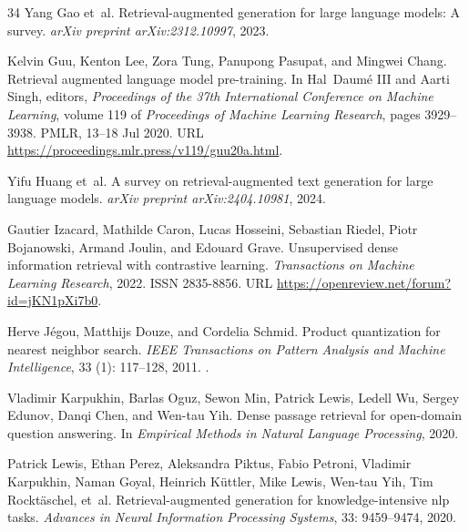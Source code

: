 \begin{thebibliography}{34}
Yang Gao et~al.
\newblock Retrieval-augmented generation for large language models: A survey.
\newblock \emph{arXiv preprint arXiv:2312.10997}, 2023{}.

Kelvin Guu, Kenton Lee, Zora Tung, Panupong Pasupat, and Mingwei Chang.
\newblock Retrieval augmented language model pre-training.
\newblock In Hal~Daumé III and Aarti Singh, editors, \emph{Proceedings of the 37th International Conference on Machine Learning}, volume 119 of \emph{Proceedings of Machine Learning Research}, pages 3929--3938. PMLR, 13--18 Jul 2020.
\newblock URL \url{https://proceedings.mlr.press/v119/guu20a.html}.

Yifu Huang et~al.
\newblock A survey on retrieval-augmented text generation for large language models.
\newblock \emph{arXiv preprint arXiv:2404.10981}, 2024.

Gautier Izacard, Mathilde Caron, Lucas Hosseini, Sebastian Riedel, Piotr Bojanowski, Armand Joulin, and Edouard Grave.
\newblock Unsupervised dense information retrieval with contrastive learning.
\newblock \emph{Transactions on Machine Learning Research}, 2022.
\newblock ISSN 2835-8856.
\newblock URL \url{https://openreview.net/forum?id=jKN1pXi7b0}.

Herve Jégou, Matthijs Douze, and Cordelia Schmid.
\newblock Product quantization for nearest neighbor search.
\newblock \emph{IEEE Transactions on Pattern Analysis and Machine Intelligence}, 33 (1): 117--128, 2011.
\newblock {}.

Vladimir Karpukhin, Barlas Oguz, Sewon Min, Patrick Lewis, Ledell Wu, Sergey Edunov, Danqi Chen, and Wen-tau Yih.
\newblock Dense passage retrieval for open-domain question answering.
\newblock In \emph{Empirical Methods in Natural Language Processing}, 2020.

Patrick Lewis, Ethan Perez, Aleksandra Piktus, Fabio Petroni, Vladimir Karpukhin, Naman Goyal, Heinrich K{\"u}ttler, Mike Lewis, Wen-tau Yih, Tim Rockt{\"a}schel, et~al.
\newblock Retrieval-augmented generation for knowledge-intensive nlp tasks.
\newblock \emph{Advances in Neural Information Processing Systems}, 33: 9459--9474, 2020.


\end{thebibliography}
